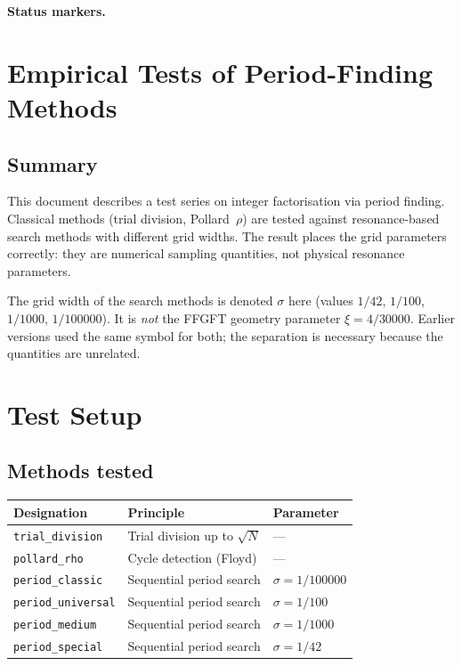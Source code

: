 
\medskip\noindent\textbf{Status markers.}


\section{Empirical Tests of Period-Finding Methods}

\subsection*{Summary}

This document describes a test series on integer factorisation via period
finding. Classical methods (trial division, Pollard~$\rho$) are tested against
resonance-based search methods with different grid widths. The result places
the grid parameters correctly: they are numerical sampling quantities, not
physical resonance parameters.

\begin{keyresult}
The grid width of the search methods is denoted $\sigma$ here (values $1/42$,
$1/100$, $1/1000$, $1/100000$). It is \emph{not} the FFGFT geometry parameter
$\xi = 4/30000$. Earlier versions used the same symbol for both; the
separation is necessary because the quantities are unrelated.
\end{keyresult}

\section{Test Setup}

\subsection{Methods tested}

\begin{center}
\begin{tabular}{lll}
\toprule
Designation & Principle & Parameter \\
\midrule
\texttt{trial\_division} & Trial division up to $\sqrt{N}$ & --- \\
\texttt{pollard\_rho} & Cycle detection (Floyd) & --- \\
\texttt{period\_classic} & Sequential period search & $\sigma = 1/100000$ \\
\texttt{period\_universal} & Sequential period search & $\sigma = 1/100$ \\
\texttt{period\_medium} & Sequential period search & $\sigma = 1/1000$ \\
\texttt{period\_special} & Sequential period search & $\sigma = 1/42$ \\
\bottomrule
\end{tabular}
\end{center}

